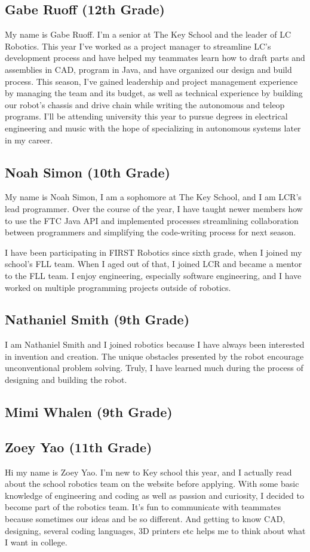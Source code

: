 \documentclass[12pt]{article}
\begin{document}
\subsection{Gabe Ruoff (12th Grade)}
My name is Gabe Ruoff. I’m a senior at The Key School and the leader of LC Robotics. This year I’ve worked as a project manager to streamline LC’s development process and have helped my teammates learn how to draft parts and assemblies in CAD, program in Java, and have organized our design and build process. This season, I’ve gained leadership and project management experience by managing the team and its budget, as well as technical experience by building our robot’s chassis and drive chain while writing the autonomous and teleop programs. I’ll be attending university this year to pursue degrees in electrical engineering and music with the hope of specializing in autonomous systems later in my career.

\subsection{Noah Simon (10th Grade)}
My name is Noah Simon, I am a sophomore at The Key School, and I am LCR’s lead programmer. Over the course of the year, I have taught newer members how to use the FTC Java API and implemented processes streamlining collaboration between programmers and simplifying the code-writing process for next season.

I have been participating in FIRST Robotics since sixth grade, when I joined my school’s FLL team. When I aged out of that, I joined LCR and became a mentor to the FLL team. I enjoy engineering, especially software engineering, and I have worked on multiple programming projects outside of robotics.

\subsection{Nathaniel Smith (9th Grade)}
I am Nathaniel Smith and I joined robotics because I have always been interested in invention and creation. The unique obstacles presented by the robot encourage unconventional problem solving. Truly, I have learned much during the process of designing and building the robot.

\subsection{Mimi Whalen (9th Grade)}

\subsection{Zoey Yao (11th Grade)}
Hi my name is Zoey Yao. I’m new to Key school this year, and I actually read about the school robotics team on the website before applying. With some basic knowledge of engineering and coding as well as passion and curiosity, I decided to become part of the robotics team. It’s fun to communicate with teammates because sometimes our ideas and be so different. And getting to know CAD, designing, several coding languages, 3D printers etc helps me to think about what I want in college.
\end{document}
